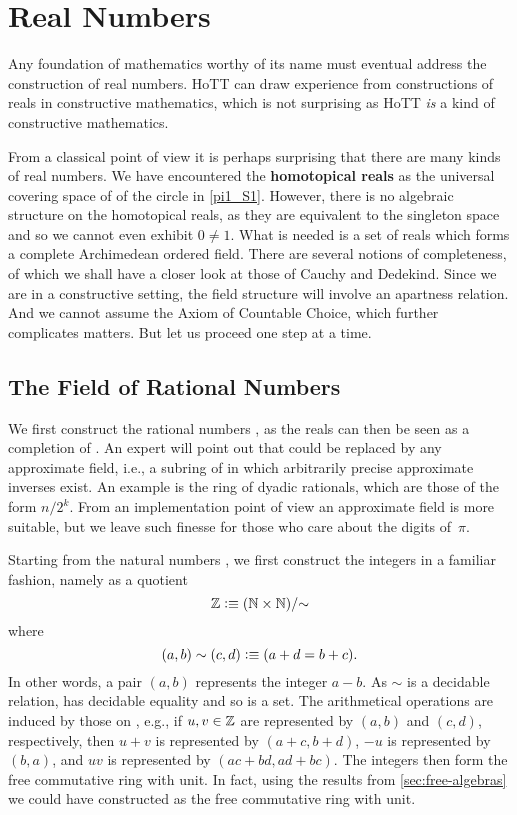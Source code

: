 \newcommand{\rclim}{\mathsf{lim}} %
\newcommand{\Qp}{\Q_{+}}

\chapter{Real Numbers}
\label{cha:real-numbers}

Any foundation of mathematics worthy of its name must eventual address the construction of
real numbers. HoTT can draw experience from constructions of reals in constructive
mathematics, which is not surprising as HoTT \emph{is} a kind of constructive mathematics.

From a classical point of view it is perhaps surprising that there are many kinds of real
numbers. We have encountered the \textbf{homotopical reals} as the universal covering
space of of the circle in \autoref{pi1_S1}. However, there is no algebraic structure on
the homotopical reals, as they are equivalent to the singleton space and so we cannot even
exhibit $0 \neq 1$. What is needed is a set of reals which forms a complete Archimedean
ordered field. There are several notions of completeness, of which we shall have a closer
look at those of Cauchy and Dedekind. Since we are in a constructive setting, the field
structure will involve an apartness relation. And we cannot assume the Axiom of Countable
Choice, which further complicates matters. But let us proceed one step at a time.

\section{The Field of Rational Numbers}
\label{sec:field-rati-numb}

We first construct the rational numbers \Q, as the reals can then be seen as a completion
of \Q. An expert will point out that \Q could be replaced by any approximate field, i.e.,
a subring of \Q in which arbitrarily precise approximate inverses exist. An example is the
ring of dyadic rationals, which are those of the form $n/2^k$. From an
implementation point of view an approximate field is more suitable, but we leave such
finesse for those who care about the digits of~$\pi$.

Starting from the natural numbers \N, we first construct the integers in a familiar
fashion, namely as a quotient
%
\[ \mathbb{Z} \vcentcolon\equiv (\mathbb{N} \times \mathbb{N})/{\sim} \]
%
where
%
\[ (a,b) \sim (c,d) \vcentcolon\equiv (a + d = b + c). \]
%
In other words, a pair $(a,b)$ represents the integer $a - b$. As $\sim$ is a decidable
relation, \Z has decidable equality and so is a set. The arithmetical operations are
induced by those on \N, e.g., if $u, v \in \mathbb{Z}$ are represented by $(a,b)$ and $(c,d)$,
respectively, then $u + v$ is represented by $(a + c, b + d)$, $-u$ is represented by $(b,
a)$, and $u v$ is represented by $(a c + b d, a d + b c)$. The integers \Z then form the
free commutative ring with unit. In fact, using the results from
\autoref{sec:free-algebras} we could have constructed \Z as the free commutative ring with
unit.

